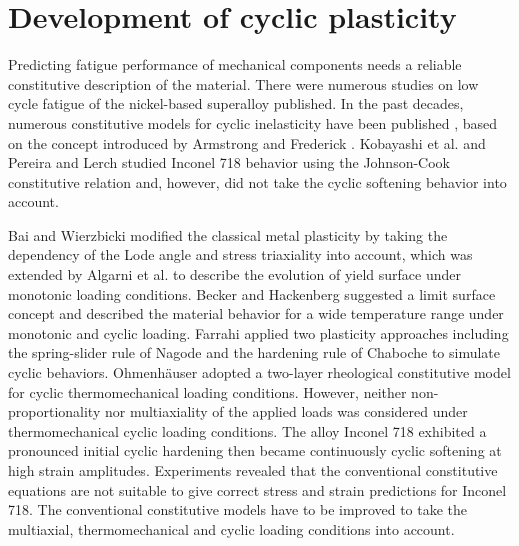\section{Development of cyclic plasticity}
\noindent
Predicting fatigue performance of mechanical components needs a reliable constitutive description of the material. There were numerous studies on low cycle fatigue of the nickel-based superalloy published. In the past decades, numerous constitutive models for cyclic inelasticity have been published \cite{ohno1993kinematic, Pun2014138, Abdel2000, Kang2004299}, based on the concept introduced by Armstrong and Frederick \cite{armstrong1966mathematical}. Kobayashi et al. \cite{Kobayashi2008389} and Pereira and Lerch \cite{Pereira2001715} studied Inconel 718 behavior using the Johnson-Cook constitutive relation and, however, did not take the cyclic softening behavior into account.


Bai and Wierzbicki \cite{Bai20081071} modified the classical metal plasticity by taking the dependency of the Lode angle and stress triaxiality into account, which was extended by Algarni et al. \cite{Algarni2015140} to describe the evolution of yield surface under monotonic loading conditions. Becker and Hackenberg \cite{Becker2011596} suggested a limit surface concept and described the material behavior for a wide temperature range under monotonic and cyclic loading.
Farrahi \cite{Farrahi2014245} applied two plasticity approaches including the spring-slider rule of Nagode and the hardening rule of Chaboche to simulate cyclic behaviors.
Ohmenh\"{a}user \cite{Ohmenhauser2014631} adopted a two-layer rheological constitutive model for cyclic thermomechanical loading conditions.
However, neither non-proportionality nor multiaxiality of the applied loads was considered under thermomechanical cyclic loading conditions.
The alloy Inconel 718 exhibited a pronounced initial cyclic hardening then became continuously cyclic softening at high strain amplitudes. Experiments revealed that the conventional constitutive equations are not suitable to give correct stress and strain predictions for Inconel 718. The conventional constitutive models have to be improved to take the multiaxial, thermomechanical and cyclic loading conditions into account.

